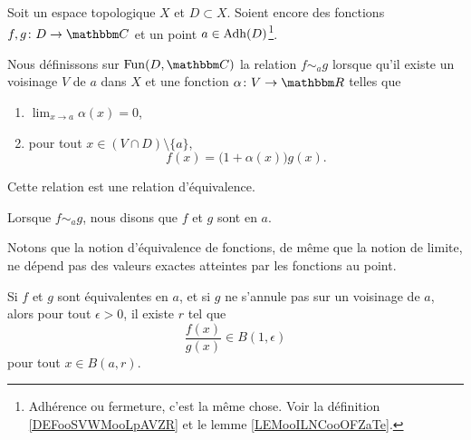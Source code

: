 \begin{propositionDef}       \label{DEFooWDSAooKXZsZY}
    Soit un espace topologique \( X\) et \( D\subset X\). Soient encore des fonctions \( f,g\colon D\to \eC\) et un point \( a\in\operatorname{Adh}(D)\)\footnote{Adhérence ou fermeture, c'est la même chose. Voir la définition \ref{DEFooSVWMooLpAVZR} et le lemme \ref{LEMooILNCooOFZaTe}.}.

    Nous définissons sur \( \Fun(D,\eC)\) la relation \( f\sim_ag\) lorsque qu'il existe un voisinage \( V\) de \( a\) dans \( X\) et une fonction \( \alpha\colon V\to \eR\) telles que
    \begin{enumerate}
        \item
            \( \lim_{x\to a} \alpha(x)=0\),
        \item
            pour tout \( x\in (V\cap D)\setminus\{ a \}\), 
            \begin{equation}        \label{EQooQXKYooSDPpNq}
                f(x)=\big( 1+\alpha(x) \big)g(x).
            \end{equation}
    \end{enumerate}
    Cette relation est une relation d'équivalence.

    Lorsque \( f\sim_a g\), nous disons que \( f\) et \( g\) sont  en \( a\).
\end{propositionDef}

Notons que la notion d'équivalence de fonctions, de même que la notion de limite, ne dépend pas des valeurs exactes atteintes par les fonctions au point.

\begin{lemma}
    Si \( f\) et \( g\) sont équivalentes en \( a\), et si \( g\) ne s'annule pas sur un voisinage de \( a\), alors pour tout \( \epsilon>0\), il existe \( r\) tel que
    \begin{equation}
        \frac{ f(x) }{ g(x) }\in B(1,\epsilon)
    \end{equation}
    pour tout \( x\in B(a,r)\).
\end{lemma}

